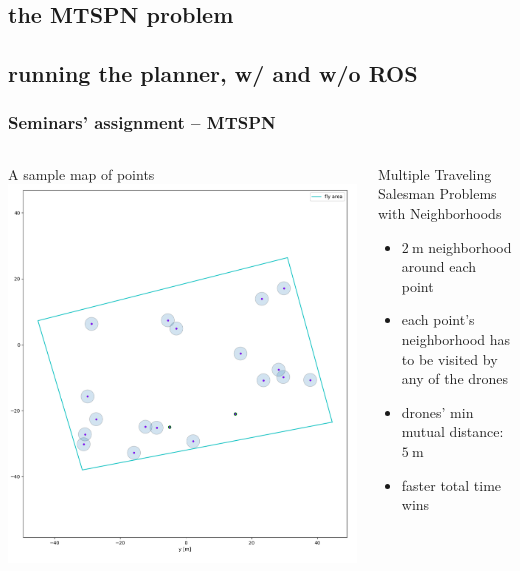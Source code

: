 \documentclass[aspectratio=1610]{beamer}
\newcommand{\unit}[2]{$#1~\ensuremath{\mathrm{#2}}$}
\begin{document}
\subsection{the MTSPN problem}
\subsection{running the planner, w/ and w/o ROS}


\begin{frame}
  \frametitle{Seminars' assignment -- MTSPN}

  \begin{columns}[c]

    \begin{block}{A sample map of points}
      \includegraphics[width=1.0\textwidth]{./fig/tsp_points.png}
    \end{block}

    \begin{block}{Multiple Traveling Salesman Problems with Neighborhoods}
      \begin{itemize}
        \item \unit{2}{m} neighborhood around each point
        \item each point's neighborhood has to be visited by any of the drones
        \item drones' min mutual distance: \unit{5}{m}
        \item faster total time wins
      \end{itemize}
    \end{block}


\end{columns}
\end{frame}
\end{document}
